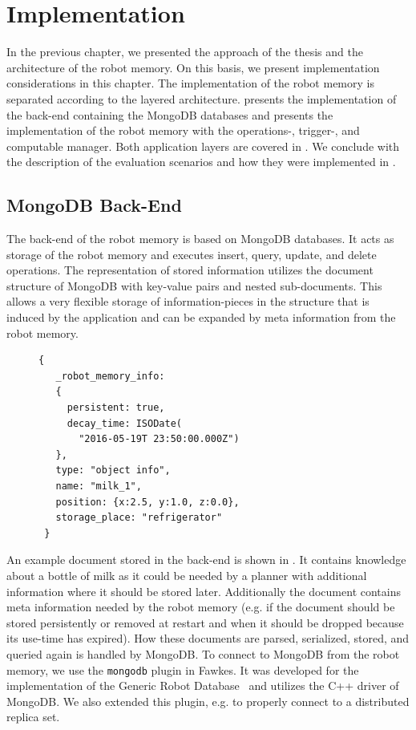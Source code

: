 \chapter{Implementation}
\label{chap:impl}
In the previous chapter, we presented the approach of the thesis and
the architecture of the robot memory. On this basis, we present
implementation considerations in this chapter. The implementation of
the robot memory is separated according to the layered
architecture.  presents the implementation of the
back-end containing the MongoDB databases and 
presents the implementation of the robot memory with the operations-,
trigger-, and computable manager. Both application layers are covered
in . We conclude with the description of the
evaluation scenarios and how they were implemented in
.

\section{MongoDB Back-End}
\label{sec:back-end}
The back-end of the robot memory is based on MongoDB databases. It
acts as storage of the robot memory and executes insert, query,
update, and delete operations. The representation of stored information
utilizes the document structure of MongoDB with key-value pairs and
nested sub-documents. This allows a very flexible storage of
information-pieces in the structure that is induced by the application
and can be expanded by meta information from the robot memory.

\begin{figure}
  \vspace{-0.8cm}
\begin{lstlisting}[style=SmallJSON,
  caption={Representation of a knowledge piece in the back-end},
  label=lst:backend,
  framexleftmargin=1pt, xleftmargin=0pt,
 morekeywords={}, numbers=none]
 {
   _robot_memory_info:
   {
     persistent: true,
     decay_time: ISODate(
       "2016-05-19T 23:50:00.000Z")
   },
   type: "object info",
   name: "milk_1",
   position: {x:2.5, y:1.0, z:0.0},
   storage_place: "refrigerator"
 }
\end{lstlisting}
\vspace{-8mm}
\end{figure}
An example document stored in the back-end is shown in
. It contains knowledge about a bottle of milk as
it could be needed by a planner with additional information where it
should be stored later. Additionally the document contains meta
information needed by the robot memory (e.g. if the document should be
stored persistently or removed at restart and when it should be
dropped because its use-time has expired). How these documents are
parsed, serialized, stored, and queried again is handled by
MongoDB. To connect to MongoDB from the robot memory, we use the
\texttt{mongodb} plugin in Fawkes. It was developed for the
implementation of the Generic Robot Database~\cite{RoboDB} and
utilizes the C++ driver of MongoDB. We also extended this plugin,
e.g. to properly connect to a distributed replica set.

